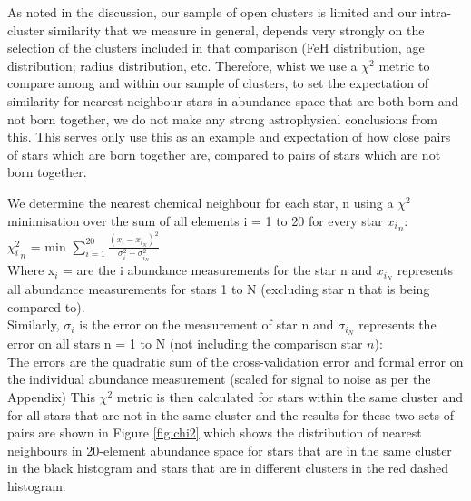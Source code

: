 \documentclass[14pt, preprint2]{aastex6}
\begin{document}
As noted in the discussion,  our sample of open clusters is limited and our intra-cluster similarity that we measure in general, depends very strongly on the selection of the clusters included in that comparison (FeH distribution, age distribution; radius distribution, etc. Therefore, whist we use a $\chi^2$ metric to compare among and within our sample of clusters, to set the expectation of similarity for nearest neighbour stars in abundance space that are both born and not born together, we do not make any  strong astrophysical conclusions from this. This serves only use this as an example and expectation of how close pairs of stars which are born together are, compared to pairs of stars which are not born together.  

We determine the nearest chemical neighbour for each star, n using a $\chi^2$ minimisation over the sum of all elements i = 1 to 20 for every star ${x_i}_n$: \\

${\chi_i^2}_n$ = min $ \sum_{i=1}^{20}  \frac{(x_i - x_{i_N})^2}{\sigma_i^2 + \sigma_{i_N}^2}$  \\

Where x$_i$ = are the i abundance measurements for the star n and  $x_{i_N}$ represents all abundance measurements for stars 1 to N (excluding star n that is being compared to). \\
Similarly, $\sigma_i$ is the error on the measurement of star n and $\sigma_{i_N}$ represents the error on all stars n = 1 to N (not including the comparison star $n$): \\
The errors are the quadratic sum of the cross-validation error and formal error on the individual abundance measurement (scaled for signal to noise as per the Appendix) 
This $\chi^2$ metric is then calculated for stars within the same cluster and for all stars that are not in the same cluster and the results for these two sets of pairs are shown in Figure \ref{fig:chi2} which shows the distribution of nearest neighbours in 20-element abundance space for stars that are in the same cluster in the black histogram and stars that are in different clusters in the red dashed histogram. 
\end{document}
